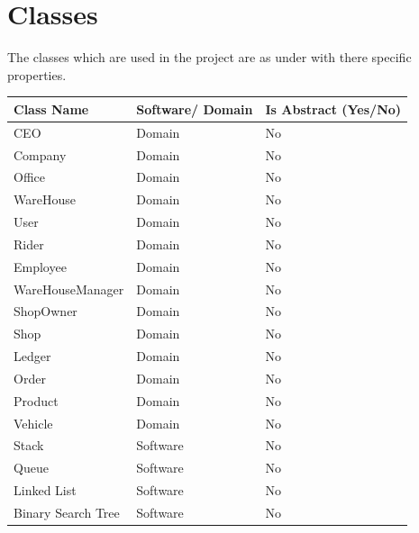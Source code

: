\documentclass[12pt,a4paper]{report}
\begin{document}
\chapter {Classes}
The classes which are used in the project are as under with there specific properties. 
\begin{center}
\begin{tabular}{ | m{4cm}|m{4cm}|m{4cm}|} 
 \hline

\textbf {Class Name} & \textbf{ Software/ Domain }&\textbf {Is Abstract (Yes/No)}\\ \hline
 CEO 		&Domain			&No\\ \hline
Company		&Domain			&No\\ \hline
Office		&Domain			&No\\ \hline
WareHouse	&Domain			&No\\ \hline
User		&Domain			&No\\ \hline
Rider		&Domain			&No\\ \hline
Employee  	&Domain			&No\\ \hline
WareHouseManager&Domain		&No\\ \hline
ShopOwner 	&Domain			&No\\ \hline
Shop	  	&Domain			&No\\ \hline
Ledger	  	&Domain			&No\\ \hline
Order		&Domain			&No\\ \hline
Product		&Domain			&No\\ \hline
Vehicle		&Domain			&No\\ \hline
Stack		&Software		&No\\ \hline
Queue		&Software		&No\\ \hline
Linked List	&Software		&No\\ \hline
Binary Search Tree&Software	&No\\ \hline
\end{tabular}
\end{center}
\end{document}
